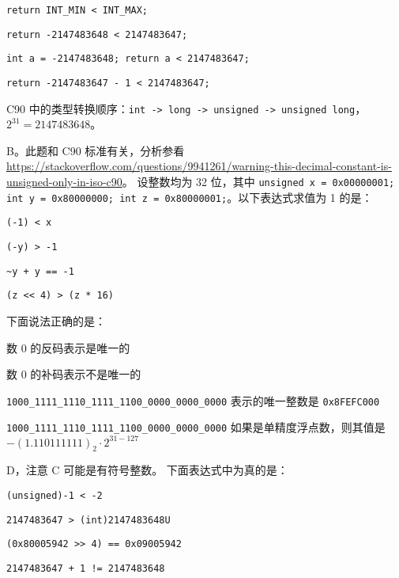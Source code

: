 \begin{problems}
        \begin{choices}
            \item \verb|return INT_MIN < INT_MAX;|
            \item \verb|return -2147483648 < 2147483647;|
            \item \verb|int a = -2147483648; return a < 2147483647;|
            \item \verb|return -2147483647 - 1 < 2147483647;|
        \end{choices}
        \begin{hint}
            C90 中的类型转换顺序：\texttt{int -> long -> unsigned -> unsigned long}，$2^{31}=2147483648$。
        \end{hint}
        \sol B。此题和 C90 标准有关，分析参看 \url{https://stackoverflow.com/questions/9941261/warning-this-decimal-constant-is-unsigned-only-in-iso-c90}。
         设整数均为 32 位，其中 \texttt{unsigned x = 0x00000001; int y = 0x80000000; int z = 0x80000001;}。以下表达式求值为 1 的是：
        \begin{choices}
            \item \verb|(-1) < x|
            \item \verb|(-y) > -1|
            \item \verb|~y + y == -1|
            \item \verb|(z << 4) > (z * 16)|
        \end{choices}
         下面说法正确的是：
        \begin{choices}
            \item 数 0 的反码表示是唯一的
            \item 数 0 的补码表示不是唯一的
            \item \verb|1000_1111_1110_1111_1100_0000_0000_0000| 表示的唯一整数是 \texttt{0x8FEFC000}
            \item \verb|1000_1111_1110_1111_1100_0000_0000_0000| 如果是单精度浮点数，则其值是 $-(1.110111111)_2 \cdot 2^{31-127}$
        \end{choices}
        \sol D，注意 C 可能是有符号整数。
         下面表达式中为真的是：
        \begin{choices}
            \item \verb|(unsigned)-1 < -2|
            \item \verb|2147483647 > (int)2147483648U|
            \item \verb|(0x80005942 >> 4) == 0x09005942|
            \item \verb|2147483647 + 1 != 2147483648|

\end{choices}
\end{problems}

